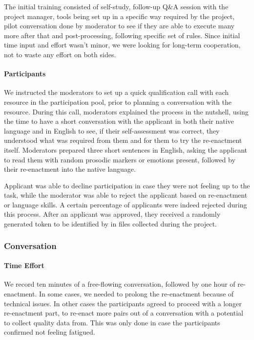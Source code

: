 The initial training consisted of self-study, follow-up Q\&A session with the project manager, tools being set up in a specific way required by the project, pilot conversation done by moderator to see if they are able to execute many more after that and post-processing, following specific set of rules. Since initial time input and effort wasn’t minor, we were looking for long-term cooperation, not to waste any effort on both sides. 

\paragraph{\textbf{Participants}}

We instructed the moderators to set up a quick qualification call with each resource in the participation pool, prior to planning a conversation with the resource. 
During this call, moderators explained the process in the nutshell, using the time to have a short conversation with the applicant in both their native language and in English to see, if their self-assessment was correct, they understood what was required from them and for them to try the re-enactment itself. Moderators prepared three short sentences in English, asking the applicant to read them with random prosodic markers or emotions present, followed by their re-enactment into the native language. 

Applicant was able to decline participation in case they were not feeling up to the task, while the moderator was able to reject the applicant based on re-enactment or language skills. A certain percentage of applicants were indeed rejected during this process. After an applicant was approved, they received a randomly generated token to be identified by in files collected during the project. 

\subsubsection{Conversation}

\paragraph{\textbf{Time Effort}}
We record ten minutes of a free-flowing conversation, followed by one hour of re-enactment. In some cases, we needed to prolong the re-enactment because of technical issues. In other cases the participants agreed to proceed with a longer re-enactment part, to re-enact more pairs out of a conversation with a potential to collect quality data from. This was only done in case the participants confirmed not feeling fatigued.

